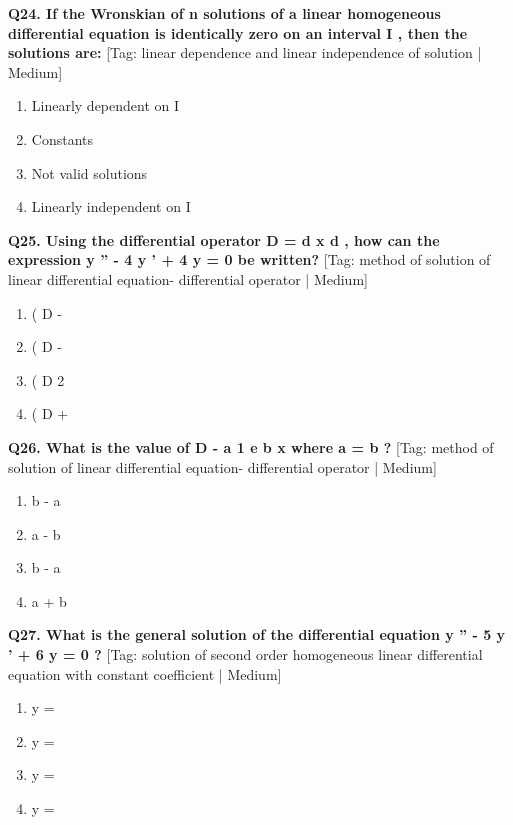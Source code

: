 \noindent\textbf{Q24. If the Wronskian of n solutions of a linear homogeneous differential equation is identically zero on an interval I , then the solutions are:} \hfill [Tag: linear dependence and linear independence of solution | Medium]
\begin{enumerate}[label=(\alph*),topsep=2pt,itemsep=1pt,partopsep=0pt,parsep=0pt]
    \item {{Linearly dependent on I}}
    \item {{Constants}}
    \item {{Not valid solutions}}
    \item {{Linearly independent on I}}
\end{enumerate}
\vspace{2mm}

\noindent\textbf{Q25. Using the differential operator D = d x d , how can the expression y '' - 4 y ' + 4 y = 0 be written?} \hfill [Tag: method of solution of linear differential equation- differential operator | Medium]
\begin{enumerate}[label=(\alph*),topsep=2pt,itemsep=1pt,partopsep=0pt,parsep=0pt]
    \item {{( D -}}
    \item {{( D -}}
    \item {{( D 2}}
    \item {{( D +}}
\end{enumerate}
\vspace{2mm}

\noindent\textbf{Q26. What is the value of D - a 1 e b x where a  = b ?} \hfill [Tag: method of solution of linear differential equation- differential operator | Medium]
\begin{enumerate}[label=(\alph*),topsep=2pt,itemsep=1pt,partopsep=0pt,parsep=0pt]
    \item {{b - a}}
    \item {{a - b}}
    \item {{b - a}}
    \item {{a + b}}
\end{enumerate}
\vspace{2mm}

\noindent\textbf{Q27. What is the general solution of the differential equation y '' - 5 y ' + 6 y = 0 ?} \hfill [Tag: solution of second order homogeneous linear differential equation with constant coefficient | Medium]
\begin{enumerate}[label=(\alph*),topsep=2pt,itemsep=1pt,partopsep=0pt,parsep=0pt]
    \item {{y =}}
    \item {{y =}}
    \item {{y =}}
    \item {{y =}}
\end{enumerate}
\vspace{2mm}

